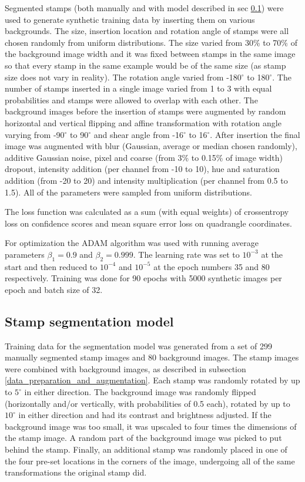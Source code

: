 \documentclass[twocolumn]{svjour3}
\begin{document}
Segmented stamps (both manually and with model described in sec \ref{methods_segmentation}) were used to generate synthetic training data by inserting them on various backgrounds. The size, insertion location and rotation angle of stamps were all chosen randomly from uniform distributions. The size varied from 30\% to 70\% of the background image width and it was fixed between stamps in the same  image so that every stamp in the same example would be of the same size (as stamp size does not vary in reality). The rotation angle varied from -180$^\circ$ to 180$^\circ$. The number of stamps inserted in a single image varied from 1 to 3 with equal probabilities and stamps were allowed to overlap with each other. The background images before the insertion of stamps were augmented by random horizontal and vertical flipping and affine transformation with rotation angle varying from -90$^\circ$ to 90$^\circ$ and shear angle from -16$^\circ$ to 16$^\circ$. After insertion the final image was augmented with blur (Gaussian, average or median chosen randomly), additive Gaussian noise, pixel and coarse (from 3\% to 0.15\% of image width) dropout, intensity addition (per channel from -10 to 10), hue and saturation addition (from -20 to 20) and intensity multiplication (per channel from 0.5 to 1.5). All of the parameters were sampled from uniform distributions.

The loss function was calculated as a sum (with equal weights) of crossentropy loss on confidence scores and mean square error loss on quadrangle coordinates.

For optimization the ADAM \cite{Kingma2015_ADAM} algorithm was used with running average parameters $\beta_1 = 0.9$ and $\beta_2 = 0.999$. The learning rate was set to $10^{-3}$ at the start and then reduced to $10^{-4}$ and $10^{-5}$ at the epoch numbers 35 and 80 respectively. Training was done for 90 epochs with 5000 synthetic images per epoch and batch size of 32.

\subsection{Stamp segmentation model}
\label{methods_segmentation}

Training data for the segmentation model was generated from a set of 299 manually segmented stamp images and 80 background images. The stamp images were combined with background images, as described in subsection \ref{data_preparation_and_augmentation}.
Each stamp was randomly rotated by up to $5^{\circ}$ in either direction. The background image was randomly flipped (horizontally and/or vertically, with probabilities of 0.5 each), rotated by up to $10^{\circ}$ in either direction and had its contrast and brightness adjusted. If the background image was too small, it was upscaled to four times the dimensions of the stamp image. A random part of the background image was picked to put behind the stamp. Finally, an additional stamp was randomly placed in one of the four pre-set locations in the corners of the image, undergoing all of the same transformations the original stamp did.
\end{document}
